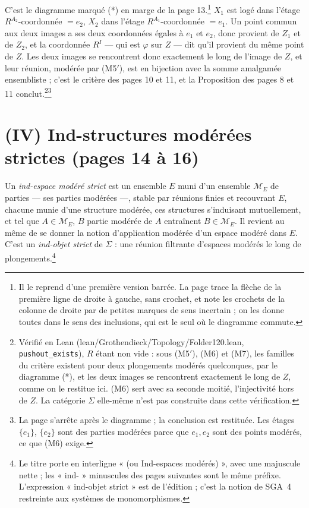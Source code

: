 \documentclass[11pt,a4paper]{article}
\begin{document}
C'est le diagramme marqué (*) en marge de la page 13.\footnote{Il le
reprend d'une première version barrée. La page trace la flèche de la première
ligne de droite à gauche, sans crochet, et note les crochets de la colonne de
droite par de petites marques de sens incertain ; on les donne toutes dans le
sens des inclusions, qui est le seul où le diagramme commute.} $X_1$ est logé
dans l'étage $R^{A_2}$-coordonnée $= e_2$, $X_2$ dans l'étage
$R^{A_1}$-coordonnée $= e_1$. Un point commun aux deux images a ses deux
coordonnées égales à $e_1$ et $e_2$, donc provient de $Z_1$ et de $Z_2$, et la
coordonnée $R^I$ — qui est $\varphi$ sur $Z$ — dit qu'il provient du même point
de $Z$. Les deux images se rencontrent donc exactement le long de l'image de
$Z$, et leur réunion, modérée par (M5$'$), est en bijection avec la somme
amalgamée ensembliste ; c'est le critère des pages 10 et 11, et la Proposition
des pages 8 et 11 conclut.\footnote{Vérifié en Lean
(lean/Grothendieck/Topology/Folder120.lean, \texttt{pushout\_exists}), $R$ étant non
vide : sous (M5$'$), (M6) et (M7), les familles du critère existent pour deux
plongements modérés quelconques, par le diagramme (*), et les deux images se
rencontrent exactement le long de $Z$, comme on le restitue ici. (M6) sert avec
sa seconde moitié, l'injectivité hors de $Z$. La catégorie $\Sigma$ elle-même
n'est pas construite dans cette vérification.}\footnote{La page s'arrête après le diagramme ; la
conclusion est restituée. Les étages $\{e_1\}$, $\{e_2\}$ sont des parties
modérées parce que $e_1, e_2$ sont des points modérés, ce que (M6) exige.}

\section*{(IV) Ind-structures modérées strictes (pages 14 à 16)}

Un \emph{ind-espace modéré strict} est un ensemble $E$ muni d'un ensemble
$\mathcal{M}_E$ de parties — ses parties modérées —, stable par réunions finies
et recouvrant $E$, chacune munie d'une structure modérée, ces structures
s'induisant mutuellement, et tel que $A \in \mathcal{M}_E$, $B$ partie modérée
de $A$ entraînent $B \in \mathcal{M}_E$. Il revient au même de se donner la
notion d'application modérée d'un espace modéré dans $E$. C'est un
\emph{ind-objet strict} de $\Sigma$ : une réunion filtrante d'espaces modérés
le long de plongements.\footnote{Le titre porte en interligne « (ou
Ind-espaces modérés) », avec une majuscule nette ; les « ind- » minuscules
des pages suivantes sont le même préfixe. L'expression « ind-objet strict »
est de l'édition ; c'est la notion de SGA~4 restreinte aux systèmes de
monomorphismes.}
\end{document}
